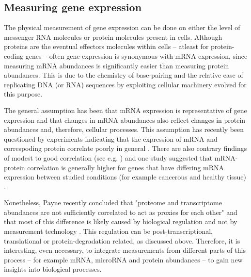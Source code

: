 







\subsection{Measuring gene expression}\label{measurement-of-gene-expression}

The physical measurement of gene expression can be done on either the level of
messenger RNA molecules or protein molecules present in cells. Although
proteins are the eventual effectors molecules within cells -- atleast for
protein-coding genes -- often gene expression is synonymous with mRNA
expression, since measuring mRNA abundances is significantly easier than
measuring protein abundances. This is due to the chemistry of base-pairing and
the relative ease of replicating DNA (or RNA) sequences by exploiting cellular machinery
evolved for this purpose.

The general assumption has been that mRNA expression is representative of gene
expression and that changes in mRNA abundances also reflect changes in protein
abundances and, therefore, cellular processes. This assumption has recently
been questioned by experiments indicating that the expression of mRNA and
correspoding protein correlate poorly in general \citep{tahanOliNiitaRefeja}.
There are also contrary findings of modest to good correlation (see e.g. \citep{})
and one study suggested that mRNA-protein correlation is generally higher for
genes that have differing mRNA expression between studied conditions (for
example cancerous and healthy tissue) \citep{seYksPaperi}.

Nonetheless, Payne recently concluded that "proteome and transcriptome abundances are not
sufficiently correlated to act as proxies for each other" and that
most of this difference is likely caused by biological regulation and not
by measurement technology \cite{Payne2015}. This regulation can be
post-transcriptional, translational or protein-degradation related, as
discussed above. Therefore, it is interesting, even necessary, to integrate
measurements from different parts of this process -- for example
mRNA, microRNA and protein abundances -- to gain new insights
into biological processes.



